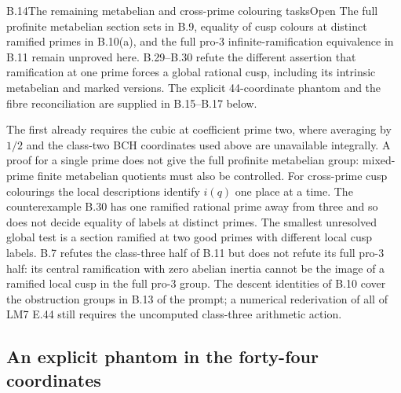 \begin{statement}{B.14}{The remaining metabelian and cross-prime colouring tasks}{Open}
The full profinite metabelian section sets in B.9, equality
of cusp colours at distinct ramified primes in B.10(a), and
the full pro-$3$ infinite-ramification equivalence in B.11
remain unproved here. B.29--B.30 refute the different assertion
that ramification at one prime forces a global rational cusp,
including its intrinsic metabelian and marked versions.
The explicit 44-coordinate phantom and the fibre reconciliation
are supplied in B.15--B.17 below.
\end{statement}
The first already requires the cubic at coefficient prime two,
where averaging by $1/2$ and the class-two BCH coordinates used
above are unavailable integrally. A proof for a single prime
does not give the full profinite metabelian group: mixed-prime
finite metabelian quotients must also be controlled. For cross-prime cusp
colourings the local descriptions identify $i(q)$ one
place at a time. The counterexample B.30 has one ramified
rational prime away from three and so does not decide equality
of labels at distinct primes. The smallest unresolved global
test is a section ramified at two good primes with different
local cusp labels. B.7 refutes the class-three half of B.11 but does not
refute its full pro-$3$ half: its central ramification with zero
abelian inertia cannot be the image of a ramified local cusp
in the full pro-$3$ group. The descent identities of B.10 cover
the obstruction groups in B.13 of the prompt; a numerical
rederivation of all of LM7 E.44 still requires the uncomputed
class-three arithmetic action.

\subsection{An explicit phantom in the forty-four coordinates}

